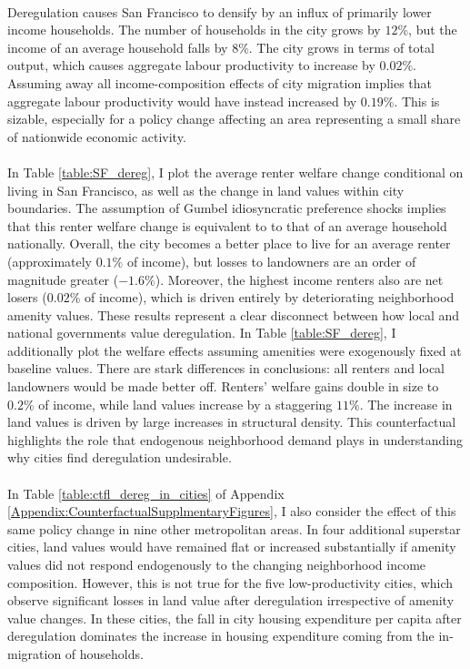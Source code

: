 \documentclass[12pt]{article}
\begin{document}
\paragraph*{}
 Deregulation causes San Francisco to densify by an influx of primarily lower income households. The number of households in the city grows by $12 \%$, but the income of an average household falls by $8 \%$.  The city grows in terms of total output, which causes aggregate labour productivity to increase by $0.02\%$. Assuming away all income-composition effects of city migration implies that aggregate labour productivity would have instead increased by $0.19\%$. This is sizable, especially for a policy change affecting an area representing a small share of nationwide economic activity.
 
 \paragraph*{}
 In Table \ref{table:SF_dereg}, I plot the average renter welfare change conditional on living in San Francisco, as well as the change in land values within city boundaries. The assumption of Gumbel idiosyncratic preference shocks implies that this renter welfare change is equivalent to to that of an average household nationally. Overall, the city becomes a better place to live for an average renter (approximately $0.1\%$ of income), but losses to landowners are an order of magnitude greater ($-1.6\%$). Moreover, the highest income renters also are net losers ($0.02\%$ of income), which is driven entirely by deteriorating neighborhood amenity values. These results represent a clear disconnect between how local and national governments value deregulation. In Table \ref{table:SF_dereg}, I additionally plot the welfare effects assuming amenities were exogenously fixed at baseline values. There are stark differences in conclusions: all renters and local landowners would be made better off. Renters' welfare gains double in size to $0.2\%$ of income, while land values increase by a staggering $11 \%$. The increase in land values is driven by large increases in structural density. This counterfactual highlights the role that endogenous neighborhood demand plays in understanding why cities find deregulation undesirable. 
 
 \paragraph*{}
 In Table \ref{table:ctfl_dereg_in_cities} of Appendix \ref{Appendix:CounterfactualSupplmentaryFigures}, I also consider the effect of this same policy change in nine other metropolitan areas. In four additional superstar cities, land values would have remained flat or increased substantially if amenity values did not respond endogenously to the changing neighborhood income composition. However, this is not true for the five low-productivity cities, which observe significant losses in land value after deregulation irrespective of amenity value changes. In these cities, the fall in city housing expenditure per capita after deregulation dominates the increase in housing expenditure coming from the in-migration of households.
 
\end{document}

